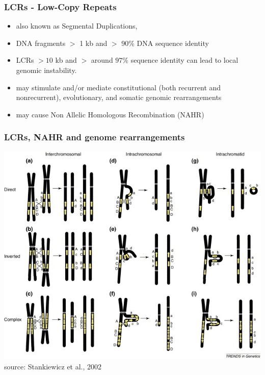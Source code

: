 



\begin{frame}\frametitle{LCRs - Low-Copy Repeats}  
\begin{itemize}
 \item also known as Segmental Duplications,
 \item DNA fragments $>$ 1 kb and $>$ 90\% DNA sequence identity
 \item LCRs $> 10$ kb and $>$ around $97\%$ sequence identity can lead to local genomic instability.
 \item may stimulate and/or mediate constitutional (both recurrent and nonrecurrent), evolutionary, and somatic genomic rearrangements
 \item may cause Non Allelic Homologous Recombination (NAHR) 
\end{itemize}
\end{frame}

\begin{frame}\frametitle{LCRs, NAHR and genome rearrangements}  
	    \begin{center}
	   \includegraphics[width=0.9 \textwidth]{new-images/NAHR-LCRs.jpg}\\
	   \tiny{source: Stankiewicz et al., 2002}  
	    \end{center}
\end{frame}


